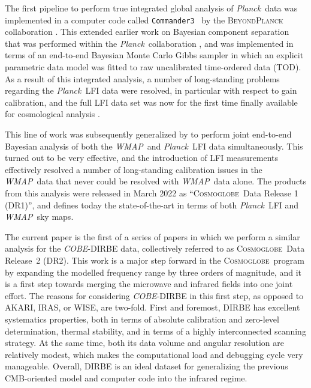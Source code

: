 \documentclass{aa}
\def\Cosmoglobe{\textsc{Cosmoglobe}}
\def\commanderthree{\texttt{Commander3}}
\def\Planck{\textit{Planck}}
\def\WMAP{\textit{WMAP}}
\def\COBE{\textit{COBE}}
\def\AKARI{\textrm{{AKARI}}}
\def\IRAS{\textrm{{IRAS}}}
\newcommand{\cosmoglobe}{\textsc{Cosmoglobe}}
\begin{document}
The first pipeline to perform true integrated global analysis of \Planck\ data was implemented in a computer code called \commanderthree\ \citep{bp03} by the \textsc{BeyondPlanck} collaboration \citep{bp01}. This extended earlier work on Bayesian component separation that was performed within the \Planck\ collaboration \citep{planck2014-a12}, and was implemented in terms of an end-to-end Bayesian Monte Carlo Gibbs sampler in which an explicit parametric data model was fitted to raw uncalibrated time-ordered data (TOD). As a result of this integrated analysis, a number of long-standing problems regarding the \Planck\ LFI data \citep{planck2016-l02} were resolved, in particular with respect to gain calibration, and the full LFI data set was now for the first time finally available for cosmological analysis \citep{bp10,bp11,bp12}.

This line of work was subsequently generalized by \citet{watts2023_dr1} to perform joint end-to-end Bayesian analysis of both the \WMAP\ and \Planck\ LFI data simultaneously. This turned out to be very effective, and the introduction of LFI measurements effectively resolved a number of long-standing calibration issues in the \WMAP\ data that never could be resolved with \WMAP\ data alone. The products from this analysis were released in March 2022 as ``\Cosmoglobe\ Data Release 1 (DR1)'', and defines today the state-of-the-art in terms of both \Planck\ LFI and \WMAP\ sky maps.

The current paper is the first of a series of papers in which we perform a similar analysis for the \COBE-DIRBE data, collectively referred to as \cosmoglobe\ Data Release~2 (DR2). This work is a major step forward in the \Cosmoglobe\ program by expanding the modelled frequency range by three orders of magnitude, and it is a first step towards merging the microwave and infrared fields into one joint effort. The reasons for considering \COBE-DIRBE in this first step, as opposed to \AKARI, \IRAS, or WISE, are two-fold. First and foremost, DIRBE has excellent systematics properties, both in terms of absolute calibration and zero-level determination, thermal stability, and in terms of a highly interconnected scanning strategy. At the same time, both its data volume and angular resolution are relatively modest, which  makes the computational load and debugging cycle very manageable. Overall, DIRBE is an ideal dataset for generalizing the previous CMB-oriented model and computer code into the infrared regime.
\end{document}
